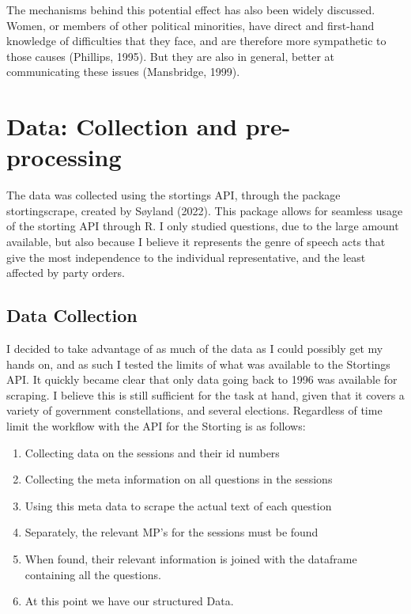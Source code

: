\documentclass[12pt]{article}
\begin{document}
	The mechanisms behind this potential effect has also been widely discussed. Women, or members of other political minorities, have direct and first-hand knowledge of difficulties that they face, and are therefore more sympathetic to those causes (Phillips, 1995). But they are also in general, better at communicating these issues (Mansbridge, 1999).
	
	\section{Data: Collection and pre-processing}
	
	The data was collected using the stortings API, through the package stortingscrape, created by Søyland (2022). This package allows for seamless usage of the storting API through R. I only studied questions, due to the large amount available, but also because I believe it represents the genre of speech acts that give the most independence to the individual representative, and the least affected by party orders.
	
	\subsection{Data Collection}
	
	I decided to take advantage of as much of the data as I could possibly get my hands on, and as such I tested the limits of what was available to the Stortings API. It quickly became clear that only data going back to 1996 was available for scraping. I believe this is still sufficient for the task at hand, given that it covers a variety of government constellations, and several elections. Regardless of time limit the workflow with the API for the Storting is as follows: 
		
	\begin{enumerate}
		\item Collecting data on the sessions and their id numbers
		\item Collecting the meta information on all questions in the sessions
		\item Using this meta data to scrape the actual text of each question
		\item Separately, the relevant MP's for the sessions must be found
		\item When found, their relevant information is joined with the dataframe containing all the questions.
		\item At this point we have our structured Data.
	\end{enumerate}
	
\end{document}
